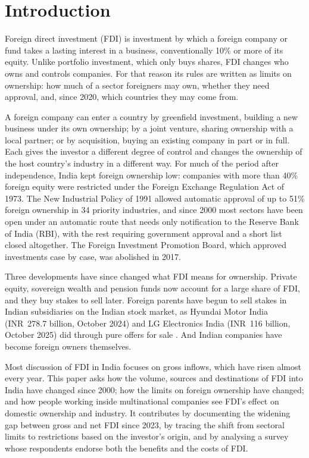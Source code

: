 \documentclass[sn-basic]{sn-jnl}
\newcommand{\INR}{INR~}
\begin{document}
\section{Introduction}\label{sec:intro}

Foreign direct investment (FDI) is investment by which a foreign company or fund takes a lasting interest in a business, conventionally 10\% or more of its equity. Unlike portfolio investment, which only buys shares, FDI changes who owns and controls companies. For that reason its rules are written as limits on ownership: how much of a sector foreigners may own, whether they need approval, and, since 2020, which countries they may come from.

A foreign company can enter a country by greenfield investment, building a new business under its own ownership; by a joint venture, sharing ownership with a local partner; or by acquisition, buying an existing company in part or in full. Each gives the investor a different degree of control and changes the ownership of the host country's industry in a different way. For much of the period after independence, India kept foreign ownership low: companies with more than 40\% foreign equity were restricted under the Foreign Exchange Regulation Act of 1973. The New Industrial Policy of 1991 allowed automatic approval of up to 51\% foreign ownership in 34 priority industries, and since 2000 most sectors have been open under an automatic route that needs only notification to the Reserve Bank of India (RBI), with the rest requiring government approval and a short list closed altogether. The Foreign Investment Promotion Board, which approved investments case by case, was abolished in 2017.

Three developments have since changed what FDI means for ownership. Private equity, sovereign wealth and pension funds now account for a large share of FDI, and they buy stakes to sell later. Foreign parents have begun to sell stakes in Indian subsidiaries on the Indian stock market, as Hyundai Motor India (\INR 278.7 billion, October 2024) and LG Electronics India (\INR 116 billion, October 2025) did through pure offers for sale \citep{bs2026ipo}. And Indian companies have become foreign owners themselves.

Most discussion of FDI in India focuses on gross inflows, which have risen almost every year. This paper asks how the volume, sources and destinations of FDI into India have changed since 2000; how the limits on foreign ownership have changed; and how people working inside multinational companies see FDI's effect on domestic ownership and industry. It contributes by documenting the widening gap between gross and net FDI since 2023, by tracing the shift from sectoral limits to restrictions based on the investor's origin, and by analysing a survey whose respondents endorse both the benefits and the costs of FDI.
\end{document}
